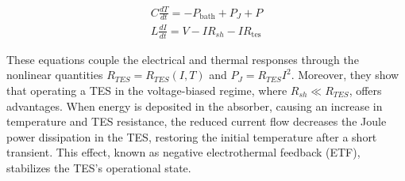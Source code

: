 \begin{eqnarray}
  C \frac{dT}{dt} = -P_{\text{bath}} + P_J + P \\ \label{eq:et1}
  L \frac{dI}{dt} = V - IR_{sh} - IR_{\text{tes}} \label{eq:et2}
\end{eqnarray}

These equations couple the electrical and thermal responses through the nonlinear quantities $R_{TES} = R_{TES}(I, T)$
and $P_J = R_{TES}I^2$. Moreover, they show that operating a TES in the voltage-biased regime, where $R_{sh} \ll R_{TES}
$, offers advantages. When energy is deposited in the absorber, causing an increase in temperature and TES resistance,
the reduced current flow decreases the Joule power dissipation in the TES, restoring the initial temperature after a
short transient. This effect, known as negative electrothermal feedback (ETF), stabilizes the TES's operational state. 
